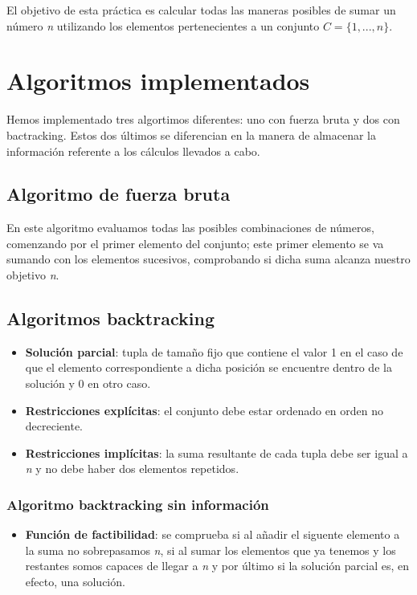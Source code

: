 \documentclass[12pt,spanish]{article}
\begin{document}
El objetivo de esta práctica es calcular todas las maneras posibles de sumar un número \textit{n} utilizando los elementos pertenecientes a un conjunto $C=\{1,...,n\}$.

\section{Algoritmos implementados}

Hemos implementado tres algortimos diferentes: uno con fuerza bruta y dos con bactracking. Estos dos últimos se diferencian en la manera de almacenar la información referente a los cálculos llevados a cabo.

\subsection{Algoritmo de fuerza bruta}

En este algoritmo evaluamos todas las posibles combinaciones de números, comenzando por el primer elemento del conjunto; este primer elemento se va sumando con los elementos sucesivos, comprobando si dicha suma alcanza nuestro objetivo \textit{n}.

\subsection{Algoritmos backtracking}

\begin{itemize}
	\item \textbf{Solución parcial}: tupla de tamaño fijo que contiene el valor 1 en el caso de que el elemento correspondiente a dicha posición se encuentre dentro de la solución y 0 en otro caso.
	\item \textbf{Restricciones explícitas}: el conjunto debe estar ordenado en orden no decreciente.
	\item \textbf{Restricciones implícitas}: la suma resultante de cada tupla debe ser igual a \textit{n} y no debe haber dos elementos repetidos.
\end{itemize}

\subsubsection{Algoritmo backtracking sin información}

\begin{itemize}
	\item \textbf{Función de factibilidad}: se comprueba si al añadir el siguente elemento a la suma no sobrepasamos \textit{n}, si al sumar los elementos que ya tenemos y los restantes somos capaces de llegar a \textit{n} y por último si la solución parcial es, en efecto, una solución.
\end{itemize}
\end{document}
